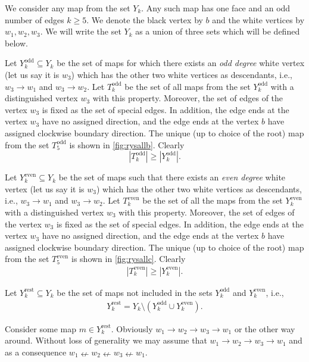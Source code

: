 \documentclass[submission]{FPSAC2021}
\DeclareMathOperator{\odd}{odd}
\DeclareMathOperator{\even}{even}
\DeclareMathOperator{\rest}{rest}
\begin{document}
We consider any map from the set $Y_k$. 
Any such map has one face and an odd 
number of edges $k \geq 5$. We denote 
the black vertex by $b$ and  the white
vertices by $w_1, w_2, w_3$. We will 
write the set $Y_k$ as a union of three 
sets which will be defined below.

Let $Y_{k}^{\odd}\subseteq Y_k$ be the 
set of maps for which there exists an
\emph{odd degree} white vertex (let us say it 
is $w_3$) which has the other two white
vertices as descendants, i.e., 
$w_3\rightarrow w_1$ and 
$w_3\rightarrow w_2$. 
Let $T_k^{\odd}$ be the set of all 
maps from the set $Y_k^{\odd}$ with a 
distinguished vertex $w_3$ with this 
property. Moreover, the set of edges of 
the vertex $w_3$ is fixed as the set of special 
edges. In addition, the edge ends at the 
vertex $w_3$ have no assigned direction, 
and the edge ends at the vertex $b$ have 
assigned clockwise boundary direction.
The unique (up to choice of the root) 
map from the set $T_{5}^{\odd}$ is 
shown in \cref{fig:rysallb}. Clearly
\begin{equation}
\label{ineqodd}
|T_{k}^{\odd}| \geq |Y_{k}^{\odd}|.
\end{equation}

Let $Y_{k}^{\even}\subseteq Y_k$ be 
the set of maps such that there
exists an \emph{even degree} white vertex 
(let us say it is $w_3$) which has 
the other two white vertices as 
descendants, i.e., 
$w_3\rightarrow w_1$ and 
$w_3\rightarrow w_2$. 
Let $T_k^{\even}$ be the set of all  
the maps from the set $Y_k^{\even}$ 
with a distinguished vertex $w_3$ with 
this property. Moreover, the set of edges 
of the vertex $w_3$ is fixed as the set of special 
edges. In addition, the edge ends at the 
vertex $w_3$ have no assigned direction, 
and the edge ends at the vertex $b$ have 
assigned clockwise boundary direction. 
The unique (up to choice of 
the root) map from the set $T_{5}^{\even}$ 
is shown in \cref{fig:rysallc}. Clearly
\begin{align}
\label{ineqeven}
|T_{k}^{\even}| \geq |Y_{k}^{\even}|.
\end{align}

Let $Y_{k}^{\rest}\subseteq Y_k$ be 
the set of maps not included in the
sets $Y_{k}^{\odd}$ and 
$Y_{k}^{\even}$, i.e.,
\begin{align}
\label{yrestdef}
Y_{k}^{\rest}=Y_k 
\setminus (Y_{k}^{\odd} 
\cup Y_{k}^{\even}).
\end{align}

Consider some map $m\in Y_{k}^{\rest}$. 
Obviously $w_1 \rightarrow w_2 
\rightarrow w_3 \rightarrow w_1$ or the 
other way around. Without  loss  of  
generality  we  may  assume  that 
$w_1 \rightarrow w_2 \rightarrow w_3 
\rightarrow w_1$ and as a consequence 
$w_1 \nleftarrow w_2 \nleftarrow w_3 
\nleftarrow w_1$.
\end{document}
